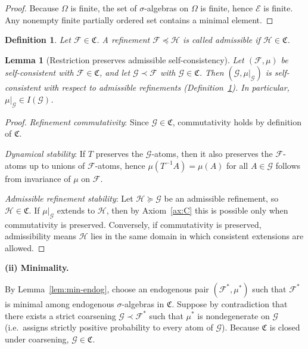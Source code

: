 \documentclass[
 amsmath,amssymb,
  onecolumn %
]{revtex4-2}
\newtheorem{lemma}[theorem]{Lemma}
\newtheorem{definition}[theorem]{Definition}
\begin{document}
\begin{proof}
Because $\Omega$ is finite, the set of $\sigma$-algebras on $\Omega$ is finite,
hence $\mathcal E$ is finite. Any nonempty finite partially ordered set contains a minimal element.
\end{proof}

\begin{definition}\label{def:admissible}
Let $\mathcal F\in\mathfrak C$. A refinement $\mathcal F\preceq\mathcal H$
is called \emph{admissible} if $\mathcal H\in\mathfrak C$.
\end{definition}

\begin{lemma}[Restriction preserves admissible self-consistency]
\label{lem:restrict}
Let $(\mathcal F,\mu)$ be self-consistent with $\mathcal F\in\mathfrak C$,
and let $\mathcal G\prec\mathcal F$ with $\mathcal G\in\mathfrak C$.
Then $(\mathcal G,\mu|_{\mathcal G})$ is self-consistent with respect to
admissible refinements (Definition~\ref{def:admissible}).
In particular, $\mu|_{\mathcal G}\in I(\mathcal G)$.
\end{lemma}

\begin{proof}
\emph{Refinement commutativity}: Since $\mathcal G\in\mathfrak C$, commutativity holds
by definition of $\mathfrak C$.

\noindent \emph{Dynamical stability}: If $T$ preserves the $\mathcal G$-atoms, then it also
preserves the $\mathcal F$-atoms up to unions of $\mathcal F$-atoms, hence
$\mu(T^{-1}A)=\mu(A)$ for all $A\in\mathcal G$ follows from invariance of
$\mu$ on $\mathcal F$.

\noindent \emph{Admissible refinement stability}: Let $\mathcal H\succeq\mathcal G$ be an
admissible refinement, so $\mathcal H\in\mathfrak C$.
If $\mu|_{\mathcal G}$ extends to $\mathcal H$, then by Axiom~\ref{ax:C}
this is possible only when commutativity is preserved.
Conversely, if commutativity is preserved, admissibility means $\mathcal H$
lies in the same domain in which consistent extensions are allowed.
\end{proof}

\noindent\textbf{(ii) Minimality.}

By Lemma~\ref{lem:min-endog}, choose an endogenous pair
$(\mathcal F^\ast,\mu^\ast)$ such that $\mathcal F^\ast$ is minimal among
endogenous $\sigma$-algebras in $\mathfrak C$.
Suppose by contradiction that there exists a strict coarsening
$\mathcal G\prec\mathcal F^{\ast}$ such that $\mu^{\ast}$ is nondegenerate
on $\mathcal G$ (i.e.\ assigns strictly positive probability to every atom
of $\mathcal G$).
Because $\mathfrak C$ is closed under coarsening,
$\mathcal G\in\mathfrak C$.
\end{document}
